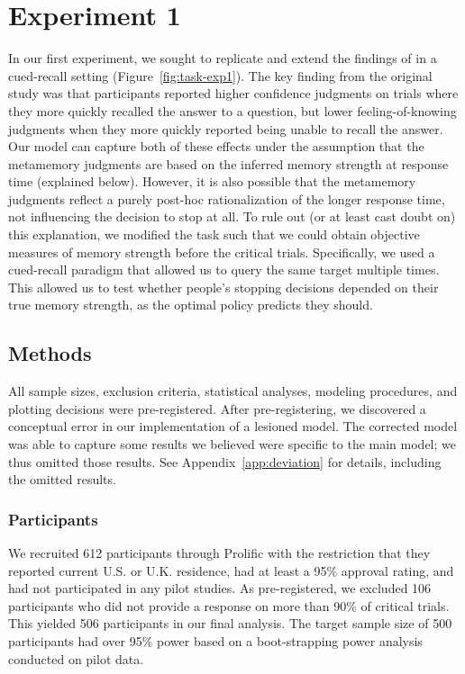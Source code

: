 \section{Experiment 1}

In our first experiment, we sought to replicate and extend the findings of \citet{costermans1992confidence} in a cued-recall setting (Figure~\ref{fig:task-exp1}). The key finding from the original study was that participants reported higher confidence judgments on trials where they more quickly recalled the answer to a question, but lower feeling-of-knowing judgments when they more quickly reported being unable to recall the answer. Our model can capture both of these effects under the assumption that the metamemory judgments are based on the inferred memory strength at response time (explained below). However, it is also possible that the metamemory judgments reflect a purely post-hoc rationalization of the longer response time, not influencing the decision to stop at all. To rule out (or at least cast doubt on) this explanation, we modified the task such that we could obtain objective measures of memory strength before the critical trials. Specifically, we used a cued-recall paradigm that allowed us to query the same target multiple times. This allowed us to test whether people's stopping decisions depended on their true memory strength, as the optimal policy predicts they should.

\subsection{Methods}

All sample sizes, exclusion criteria, statistical analyses, modeling procedures, and plotting decisions were pre-registered. After pre-registering, we discovered a conceptual error in our implementation of a lesioned model. The corrected model was able to capture some results we believed were specific to the main model; we thus omitted those results. See Appendix~\ref{app:deviation} for details, including the omitted results.

\subsubsection{Participants}

We recruited 612 participants through Prolific with the restriction that they reported current U.S. or U.K. residence, had at least a 95\% approval rating, and had not participated in any pilot studies. As pre-registered, we excluded 106 participants who did not provide a response on more than 90\% of critical trials. This yielded 506 participants in our final analysis. The target sample size of 500 participants had over 95\% power based on a boot-strapping power analysis conducted on pilot data.

